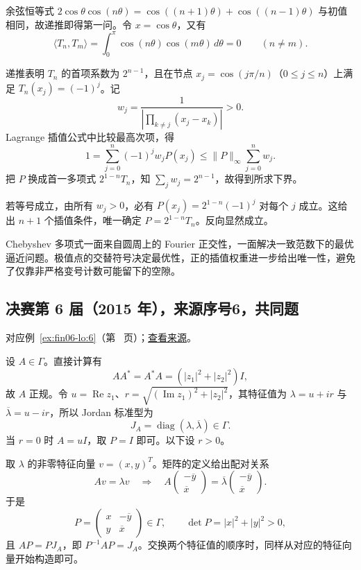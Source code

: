 \documentclass[UTF8,12pt,a4paper,fontset=fandol]{ctexart}
\begin{document}
\begin{solve}

余弦恒等式
$2\cos\theta\cos(n\theta)=\cos((n+1)\theta)+\cos((n-1)\theta)$
与初值相同，故递推即得第一问。令 $x=\cos\theta$，又有
\[
\langle T_n,T_m\rangle=\int_0^\pi\cos(n\theta)\cos(m\theta)\,d\theta=0
\qquad(n\ne m).
\]

递推表明 $T_n$ 的首项系数为 $2^{n-1}$，且在节点 $x_j=\cos(j\pi/n)$（$0\le j\le n$）上满足 $T_n(x_j)=(-1)^j$。记
\[
w_j=\frac1{\left|\prod_{k\ne j}(x_j-x_k)\right|}>0.
\]
Lagrange 插值公式中比较最高次项，得
\[
1=\sum_{j=0}^n(-1)^jw_jP(x_j)
\le\|P\|_\infty\sum_{j=0}^n w_j.
\]
把 $P$ 换成首一多项式 $2^{1-n}T_n$，知 $\sum_jw_j=2^{n-1}$，故得到所求下界。

若等号成立，由所有 $w_j>0$，必有 $P(x_j)=2^{1-n}(-1)^j$ 对每个 $j$ 成立。这给出 $n+1$ 个插值条件，唯一确定 $P=2^{1-n}T_n$。反向显然成立。

\end{solve}

\begin{remark}[方法与条件]

Chebyshev 多项式一面来自圆周上的 Fourier 正交性，一面解决一致范数下的最优逼近问题。极值点的交替符号决定最优性，正的插值权重进一步给出唯一性，避免了仅靠非严格变号计数可能留下的空隙。

\end{remark}

\subsection{决赛第 6 届（2015 年），来源序号6，共同题}\label{ans:fin06-lo:6}\label{pr:fin06-lo:6}

对应例~\ref{ex:fin06-lo:6}（第~\pageref{ex:fin06-lo:6} 页）；\href{https://github.com/lzxcr/cmc-mathematics/blob/64916fa1fdbc3e444a652eca204d5669058ee321/src/problems/finals/06/06.md}{查看来源}。

\begin{solve}

设 $A\in\Gamma$。直接计算有
\[
AA^*=A^*A=(|z_1|^2+|z_2|^2)I,
\]
故 $A$ 正规。令 $u=\operatorname{Re}z_1$、$r=\sqrt{(\operatorname{Im}z_1)^2+|z_2|^2}$，其特征值为 $\lambda=u+ir$ 与 $\overline\lambda=u-ir$，所以 Jordan 标准型为
\[
J_A=\operatorname{diag}(\lambda,\overline\lambda)\in\Gamma.
\]
当 $r=0$ 时 $A=uI$，取 $P=I$ 即可。以下设 $r>0$。

取 $\lambda$ 的非零特征向量 $v=(x,y)^T$。矩阵的定义给出配对关系
\[
Av=\lambda v
\quad\Longrightarrow\quad
A\begin{pmatrix}-\overline y\\\overline x\end{pmatrix}
=\overline\lambda\begin{pmatrix}-\overline y\\\overline x\end{pmatrix}.
\]
于是
\[
P=\begin{pmatrix}x&-\overline y\\y&\overline x\end{pmatrix}\in\Gamma,
\qquad \det P=|x|^2+|y|^2>0,
\]
且 $AP=PJ_A$，即 $P^{-1}AP=J_A$。交换两个特征值的顺序时，同样从对应的特征向量开始构造即可。

\end{solve}
\end{document}
